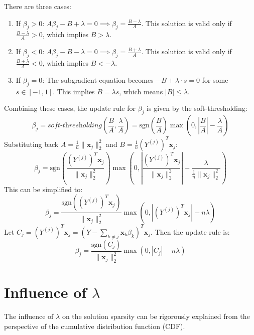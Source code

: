 \documentclass[11pt, a4paper, oneside]{memoir}
\begin{document}
There are three cases:
\begin{enumerate}
    \item If $\beta_j > 0$: $A\beta_j - B + \lambda = 0 \implies \beta_j = \frac{B - \lambda}{A}$. This solution is valid only if $\frac{B - \lambda}{A} > 0$, which implies $B > \lambda$.
    \item If $\beta_j < 0$: $A\beta_j - B - \lambda = 0 \implies \beta_j = \frac{B + \lambda}{A}$. This solution is valid only if $\frac{B + \lambda}{A} < 0$, which implies $B < -\lambda$.
    \item If $\beta_j = 0$: The subgradient equation becomes $-B + \lambda \cdot s = 0$ for some $s \in [-1, 1]$. This implies $B = \lambda s$, which means $|B| \leq \lambda$.
\end{enumerate}
Combining these cases, the update rule for $\beta_j$ is given by the soft-thresholding:
\[ \beta_j = \textit{soft-thresholding}(\frac{B}{A}, \frac{\lambda}{A}) = \text{sgn}(\frac{B}{A}) \max\left(0, |\frac{B}{A}| - \frac{\lambda}{A}\right) \]
Substituting back $A = \frac{1}{n} \|\mathbf{x}_j\|_2^2$ and $B = \frac{1}{n} (Y^{(j)})^T \mathbf{x}_j$:
\[ \beta_j = \text{sgn}\left( \frac{(Y^{(j)})^T \mathbf{x}_j}{\|\mathbf{x}_j\|_2^2} \right) \max\left(0, \left| \frac{(Y^{(j)})^T \mathbf{x}_j}{\|\mathbf{x}_j\|_2^2} \right| - \frac{\lambda}{\frac{1}{n}\|\mathbf{x}_j\|_2^2} \right) \]
This can be simplified to:
\[ \beta_j = \frac{\text{sgn}((Y^{(j)})^T \mathbf{x}_j)}{\|\mathbf{x}_j\|_2^2} \max\left(0, |(Y^{(j)})^T \mathbf{x}_j| - n\lambda \right) \]
Let $C_j = (Y^{(j)})^T \mathbf{x}_j = (Y - \sum_{k \neq j} \mathbf{x}_k\beta_k)^T \mathbf{x}_j$. Then the update rule is:
\[ \beta_j = \frac{\text{sgn}(C_j)}{\|\mathbf{x}_j\|_2^2} \max\left(0, |C_j| - n\lambda \right) \]

\section[Influence of lambda]{Influence of $\lambda$}
The influence of $\lambda$ on the solution sparsity can be rigorously explained from the perspective of the cumulative distribution function (CDF).
\end{document}
